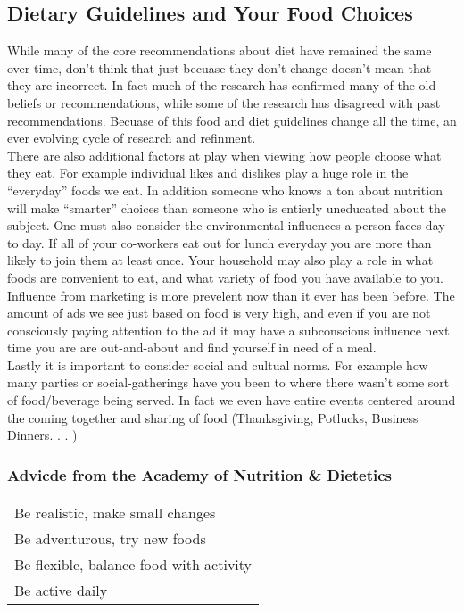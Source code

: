 \documentclass[letterpaper, 11pt]{article}
\begin{document}
\subsection{Dietary Guidelines and Your Food Choices}
\label{sec:orga1c3341}
While many of the core recommendations about diet have remained the same over time, don't think that just becuase they don't change doesn't mean that they are incorrect. In fact much of the research has confirmed many of the old beliefs or recommendations, while some of the research has disagreed with past recommendations. Becuase of this food and diet guidelines change all the time, an ever evolving cycle of research and refinment.\\
There are also additional factors at play when viewing how people choose what they eat. For example individual likes and dislikes play a huge role in the ``everyday'' foods we eat. In addition someone who knows a ton about nutrition will make ``smarter'' choices than someone who is entierly uneducated about the subject. One must also consider the environmental influences a person faces day to day. If all of your co-workers eat out for lunch everyday you are more than likely to join them at least once. Your household may also play a role in what foods are convenient to eat, and what variety of food you have available to you.\\
Influence from marketing is more prevelent now than it ever has been before. The amount of ads we see just based on food is very high, and even if you are not consciously paying attention to the ad it may have a subconscious influence next time you are are out-and-about and find yourself in need of a meal.\\
Lastly it is important to consider social and cultual norms. For example how many parties or social-gatherings have you been to where there wasn't some sort of food/beverage being served. In fact we even have entire events centered around the coming together and sharing of food (Thanksgiving, Potlucks, Business Dinners. . . )\\
\subsubsection{Advicde from the Academy of Nutrition \& Dietetics}
\label{sec:org754aa4c}
\begin{center}
\begin{tabular}{l}
Be realistic, make small changes\\
Be adventurous, try new foods\\
Be flexible, balance food with activity\\
Be active daily\\
\end{tabular}
\end{center}
\end{document}
